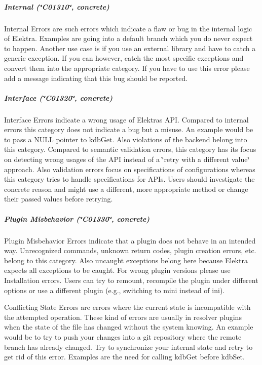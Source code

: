 \label{doc_dev_error-categorization_md_autotoc_md1472}%
%
\subparagraph*{Internal (\char`\"{}\+C01310\char`\"{}, concrete)}

{\ttfamily Internal Errors} are such errors which indicate a flaw or bug in the internal logic of Elektra. Examples are going into a {\ttfamily default} branch which you do never expect to happen. Another use case is if you use an external library and have to catch a generic exception. If you can however, catch the most specific exceptions and convert them into the appropriate category. If you have to use this error please add a message indicating that this bug should be reported.

\label{doc_dev_error-categorization_md_autotoc_md1473}%
%
\subparagraph*{Interface (\char`\"{}\+C01320\char`\"{}, concrete)}

{\ttfamily Interface Errors} indicate a wrong usage of Elektra\textquotesingle{}s A\+PI. Compared to {\ttfamily internal} errors this category does not indicate a bug but a misuse. An example would be to pass a N\+U\+LL pointer to {\ttfamily kdb\+Get}. Also violations of the backend belong into this category. Compared to semantic validation errors, this category has its focus on detecting wrong usages of the A\+PI instead of a \char`\"{}retry with a
different value\char`\"{} approach. Also validation errors focus on specifications of configurations whereas this category tries to handle specifications for A\+P\+Is. Users should investigate the concrete reason and might use a different, more appropriate method or change their passed values before retrying.

\label{doc_dev_error-categorization_md_autotoc_md1474}%
%
\subparagraph*{Plugin Misbehavior (\char`\"{}\+C01330\char`\"{}, concrete)}

{\ttfamily Plugin Misbehavior Errors} indicate that a plugin does not behave in an intended way. Unrecognized commands, unknown return codes, plugin creation errors, etc. belong to this category. Also uncaught exceptions belong here because Elektra expects all exceptions to be caught. For wrong plugin versions please use {\ttfamily Installation} errors. Users can try to remount, recompile the plugin under different options or use a different plugin (e.\+g., switching to {\ttfamily mini} instead of {\ttfamily ini}).

{\ttfamily Conflicting State Errors} are errors where the current state is incompatible with the attempted operation. These kind of errors are usually in resolver plugins when the state of the file has changed without the system knowing. An example would be to try to push your changes into a git repository where the remote branch has already changed. Try to synchronize your internal state and retry to get rid of this error. Examples are the need for calling {\ttfamily kdb\+Get} before {\ttfamily kdb\+Set}.

